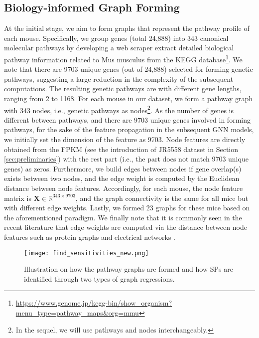 \documentclass{article} %
\begin{document}
\subsection{Biology-informed Graph Forming}\label{sec:graph_forming}
At the initial stage, we aim to form graphs that represent the pathway profile of each mouse. Specifically, we group genes (total 24,888) into 343 canonical molecular pathways by developing a web scraper extract detailed biological pathway information related to Mus musculus from the KEGG database\footnote{\url{https://www.genome.jp/kegg-bin/show_organism?menu_type=pathway_maps&org=mmu}}. We note that there are 9703 unique genes (out of 24,888) selected for forming genetic pathways, suggesting a large reduction in the complexity of the subsequent computations. The resulting genetic pathways are with different gene lengths, ranging from 2 to 1168. For each mouse in our dataset, we form a pathway graph with 343 nodes, i.e., genetic pathways as nodes\footnote{In the sequel, we will use pathways and nodes interchangeably.}. As the number of genes is different between pathways, and there are 9703 unique genes involved in forming pathways, for the sake of the feature propagation in the subsequent GNN models, we initially set the dimension of the feature as 9703. Node features are directly obtained from the FPKM (see the introduction of JR5558 dataset in Section \ref{sec:preliminaries}) with the rest part (i.e., the part does not match 9703 unique genes) as zeros. Furthermore, we build edges between nodes if gene overlap(s) exists between two nodes, and the edge weight is computed by the Euclidean distance between node features. Accordingly, for each mouse, the node feature matrix is $\mathbf X \in \mathbb R^{343 \times 9703}$, and the graph connectivity is the same for all mice but with different edge weights. Lastly, we formed 23 graphs for these mice based on the aforementioned paradigm. We finally note that it is commonly seen in the recent literature that edge weights are computed via the distance between node features such as protein graphs \citep{xu2024equivariant,wang2023graph} and electrical networks \citep{black2023understanding}.



\begin{figure}[t]
\centering
\texttt{[image: find\_sensitivities\_new.png]} 
\caption{Illustration on how the pathway graphs are formed and how SPs are identified through two types of graph regressions.}
\label{fig:graph_forming_sensitivity}
\end{figure}
\end{document}
